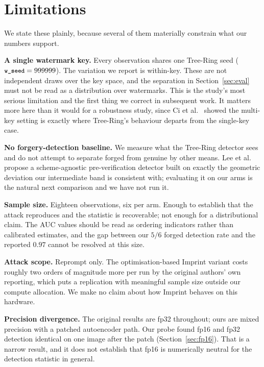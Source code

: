 \documentclass[10pt,twocolumn]{article}
\newcommand{\code}[1]{\texttt{\small #1}}
\begin{document}
\section{Limitations}
\label{sec:limits}

We state these plainly, because several of them materially constrain what our numbers
support.

\textbf{A single watermark key.} Every observation shares one Tree-Ring seed
($\code{w\_seed} = 999999$). The variation we report is within-key. These are not
independent draws over the key space, and the separation in Section~\ref{sec:eval}
must not be read as a distribution over watermarks. This is the study's most serious
limitation and the first thing we correct in subsequent work. It matters more here
than it would for a robustness study, since Ci et al.~\cite{ci2024ringid} showed the
multi-key setting is exactly where Tree-Ring's behaviour departs from the single-key
case.

\textbf{No forgery-detection baseline.} We measure what the Tree-Ring detector sees
and do not attempt to separate forged from genuine by other means. Lee et
al.~\cite{lee2026geometric} propose a scheme-agnostic pre-verification detector built
on exactly the geometric deviation our intermediate band is consistent with;
evaluating it on our arms is the natural next comparison and we have not run it.

\textbf{Sample size.} Eighteen observations, six per arm. Enough to establish that the
attack reproduces and the statistic is recoverable; not enough for a distributional
claim. The AUC values should be read as ordering indicators rather than calibrated
estimates, and the gap between our $5/6$ forged detection rate and the reported $0.97$
cannot be resolved at this size.

\textbf{Attack scope.} Reprompt only. The optimisation-based Imprint variant costs
roughly two orders of magnitude more per run by the original authors' own reporting,
which puts a replication with meaningful sample size outside our compute allocation.
We make no claim about how Imprint behaves on this hardware.

\textbf{Precision divergence.} The original results are fp32 throughout; ours are mixed
precision with a patched autoencoder path. Our probe found fp16 and fp32 detection
identical on one image after the patch (Section~\ref{sec:fp16}). That is a narrow
result, and it does not establish that fp16 is numerically neutral for the detection
statistic in general.
\end{document}
